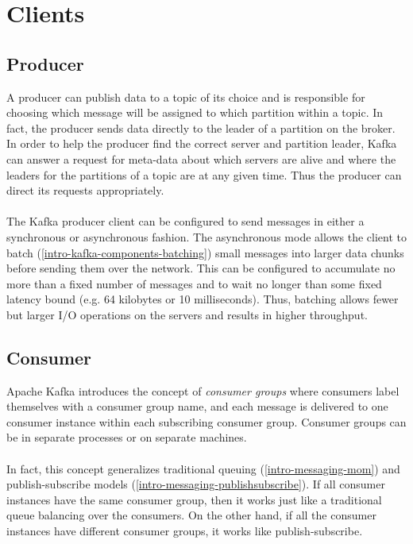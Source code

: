 \section{Clients}

\subsection{Producer}

A producer can publish data to a topic of its choice and is responsible for
choosing which message will be assigned to which partition within a topic. In
fact, the producer sends data directly to the leader of a partition on the
broker. In order to help the producer find the correct server and partition
leader, Kafka can answer a request for meta-data about which servers are alive
and where the leaders for the partitions of a topic are at any given time. Thus
the producer can direct its requests appropriately. \cite{apachekafka}
\\ \\
The Kafka producer client can be configured to send messages in either a
synchronous or asynchronous fashion. The asynchronous mode allows the client to
batch (\ref{intro-kafka-components-batching}) small messages into larger data
chunks before sending them over the network. This can be configured to accumulate
no more than a fixed number of messages and to wait no longer than some fixed
latency bound (e.g. 64 kilobytes or 10 milliseconds). Thus, batching allows
fewer but larger I/O operations on the servers and results in higher throughput.
\cite{apachekafka} \cite{goodhope2012building}

\subsection{Consumer}
\label{subsec:kafka-consumer}

Apache Kafka introduces the concept of \textit{consumer groups} where consumers
label themselves with a consumer group name, and each message is delivered to
one consumer instance within each subscribing consumer group. Consumer groups
can be in separate processes or on separate machines.
\\ \\
In fact, this concept generalizes traditional queuing (\ref{intro-messaging-mom})
and publish-subscribe models (\ref{intro-messaging-publishsubscribe}).
If all consumer instances have the same consumer
group, then it works just like a traditional queue balancing over the consumers.
On the other hand, if all the consumer instances have different consumer groups,
it works like publish-subscribe.

